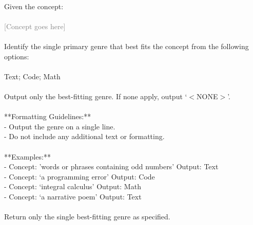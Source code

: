 
\lstset{language=python, breaklines=true}

\begin{tcolorbox}[title=Fetch genre]
\quad \\
\small 
Given the concept: \\ \\ \textcolor{gray}{[Concept goes here]} \\ \\ Identify the single primary genre that best fits the concept from the following options: \\ \\ Text; Code; Math \\ \\ Output only the best-fitting genre. If none apply, output `$<$NONE$>$'. \\ \\ **Formatting Guidelines:** \\ - Output the genre on a single line. \\ - Do not include any additional text or formatting. \\ \\ **Examples:** \\ - Concept: 'words or phrases containing odd numbers' Output: Text \\
- Concept: `a programming error' Output: Code \\
- Concept: `integral calculus' Output: Math \\
- Concept: `a narrative poem' Output: Text \\ \\ Return only the single best-fitting genre as specified.\\
\end{tcolorbox}

